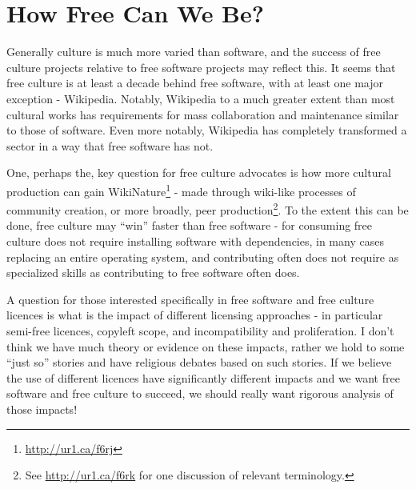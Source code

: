 \section{How Free Can We Be?}
\label{s:free_culture_software_freedom:how_free}

Generally culture is much more varied than software, and the success of free
culture projects relative to free software projects may ref\hbox{}lect this. It
seems that free culture is at least a decade behind free software, with at least
one major exception - Wikipedia. Notably, Wikipedia to a much greater extent
than most cultural works has requirements for mass collaboration and maintenance
similar to those of software. Even more notably, Wikipedia has completely
transformed a sector in a way that free software has not.

One, perhaps the, key question for free culture advocates is how more cultural
production can gain WikiNature\footnote{\url{http://ur1.ca/f6rj}} - made through
wiki-like processes of community creation, or more broadly, peer
production\footnote{See \url{http://ur1.ca/f6rk} for one discussion of relevant
terminology.}. To the extent this can be done, free culture may ``win'' faster
than free software - for consuming free culture does not require installing
software with dependencies, in many cases replacing an entire operating system,
and contributing often does not require as specialized skills as contributing to
free software often does.

A question for those interested specif\hbox{}ically in free software and free
culture licences is what is the impact of dif\hbox{}ferent licensing approaches
- in particular semi-free licences, copyleft scope, and incompatibility and
proliferation. I don't think we have much theory or evidence on these impacts,
rather we hold to some ``just so'' stories and have religious debates based on
such stories. If we believe the use of dif\hbox{}ferent licences have
signif\hbox{}icantly dif\hbox{}ferent impacts and we want free software and free
culture to succeed, we should really want rigorous analysis of those impacts!

